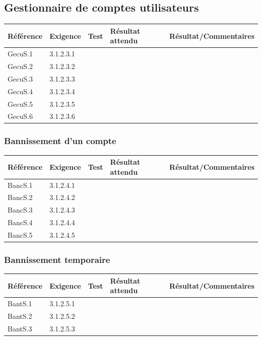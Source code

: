 \documentclass[10pt,a4paper,landscape]{report}
\begin{document}
\subsection{Gestionnaire de comptes utilisateurs}
\begin{center}
	\bgroup
	\def\arraystretch{1.5}
	\begin{tabular}{|p{1.5cm}|p{2cm}|p{8.5cm}|p{8.5cm}|p{5cm}|}
		\hline
		\rowcolor{gris}Référence & Exigence & Test & Résultat attendu & Résultat/Commentaires\\
		\hline
		GecuS.1 & 3.1.2.3.1 &  & & \\
		\hline
		GecuS.2 & 3.1.2.3.2 &  & & \\
		\hline
		GecuS.3 & 3.1.2.3.3 &  & & \\
		\hline
		GecuS.4 & 3.1.2.3.4 &  & & \\
		\hline
		GecuS.5 & 3.1.2.3.5 &  & & \\
		\hline
		GecuS.6 & 3.1.2.3.6 &  & & \\
		\hline
	\end{tabular}
	\egroup
\end{center}

\subsubsection{Bannissement d’un compte}
\begin{center}
	\bgroup
	\def\arraystretch{1.5}
	\begin{tabular}{|p{1.5cm}|p{2cm}|p{8.5cm}|p{8.5cm}|p{5cm}|}
		\hline
		\rowcolor{gris}Référence & Exigence & Test & Résultat attendu & Résultat/Commentaires\\
		\hline
		BancS.1 & 3.1.2.4.1 & & & \\
		\hline
		BancS.2 & 3.1.2.4.2 & & & \\
		\hline
		BancS.3 & 3.1.2.4.3 & & & \\
		\hline
		BancS.4 & 3.1.2.4.4 & & & \\
		\hline
		BancS.5 & 3.1.2.4.5 & & & \\
		\hline
	\end{tabular}
	\egroup
\end{center}

\subsubsection{Bannissement temporaire}
\begin{center}
	\bgroup
	\def\arraystretch{1.5}
	\begin{tabular}{|p{1.5cm}|p{2cm}|p{8.5cm}|p{8.5cm}|p{5cm}|}
		\hline
		\rowcolor{gris}Référence & Exigence & Test & Résultat attendu & Résultat/Commentaires\\
		\hline
		BantS.1 & 3.1.2.5.1 & & & \\
		\hline
		BantS.2 & 3.1.2.5.2 & & & \\
		\hline
		BantS.3 & 3.1.2.5.3 & & & \\
		\hline
	\end{tabular}
	\egroup
\end{center}
\end{document}
